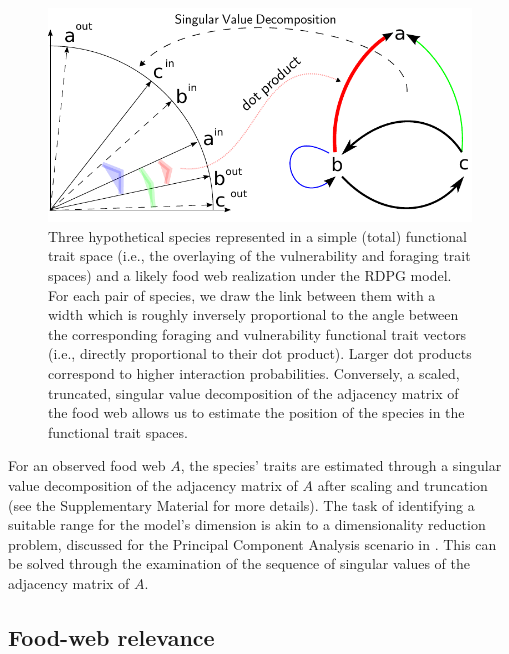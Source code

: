 \documentclass[]{rsos}%
\begin{document}
\begin{figure}[hbt]
 \centering
 \includegraphics[width=\textwidth]{./images/chap_2/RDPGmodel.pdf}
 \caption{Three hypothetical species represented in a simple (total) functional trait space
(i.e., the overlaying of the vulnerability and foraging trait spaces) and a likely
food web realization under the RDPG model. For each pair of species, we draw the link between them
with a width which is roughly inversely proportional to the angle between the corresponding foraging
and vulnerability functional trait vectors (i.e., directly proportional to their dot product).
Larger dot products correspond to higher interaction probabilities. Conversely, a scaled, truncated, singular
value decomposition of the adjacency matrix of the food web allows us to estimate the position of the species
in the functional trait spaces.}\label{fig:RDPGvignette}
\end{figure}

For an observed food web $A$, the species' traits are estimated through a singular value decomposition
of the adjacency matrix of $A$ after scaling and truncation (see the Supplementary Material for more details). 
The task of identifying a suitable range for the model's dimension is akin to a
dimensionality reduction problem, discussed for the Principal Component
Analysis scenario in \citet{jolliffe2002principal}. This can be solved
through the examination of the sequence of singular values of the adjacency matrix
of $A$.

\subsection{Food-web relevance}
\end{document}
